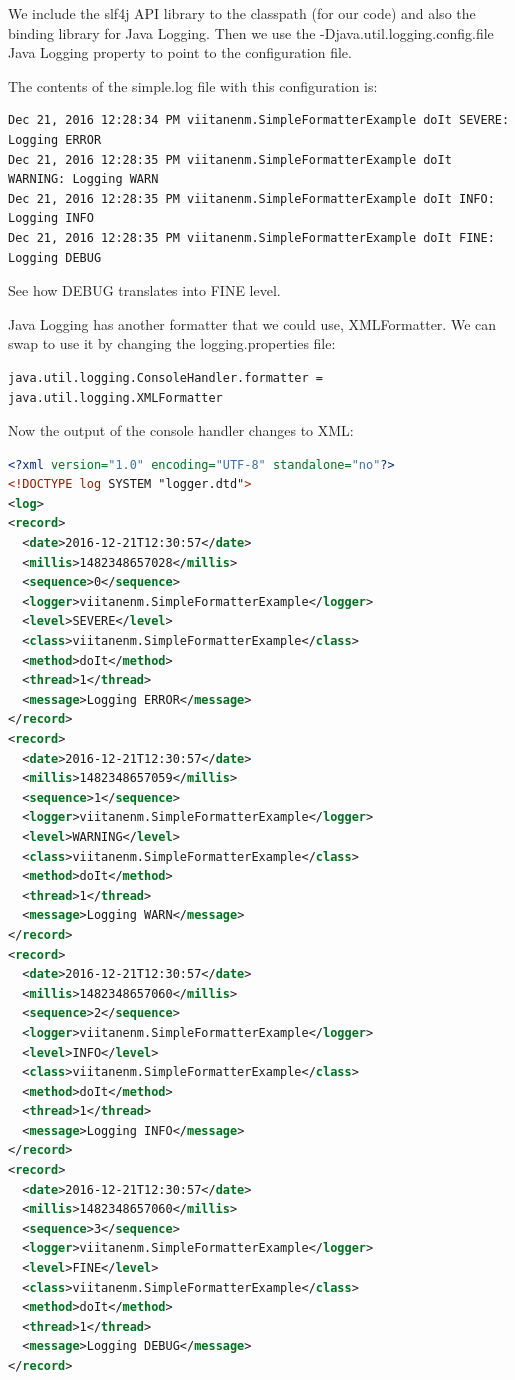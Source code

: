 We include the slf4j API library to the classpath (for our code) and also the binding library for Java Logging. Then we use the -Djava.util.logging.config.file Java Logging property to point to the configuration file.

The contents of the simple.log file with this configuration is:
\begin{lstlisting}
Dec 21, 2016 12:28:34 PM viitanenm.SimpleFormatterExample doIt SEVERE: Logging ERROR
Dec 21, 2016 12:28:35 PM viitanenm.SimpleFormatterExample doIt WARNING: Logging WARN
Dec 21, 2016 12:28:35 PM viitanenm.SimpleFormatterExample doIt INFO: Logging INFO
Dec 21, 2016 12:28:35 PM viitanenm.SimpleFormatterExample doIt FINE: Logging DEBUG
\end{lstlisting}

See how DEBUG translates into FINE level.

Java Logging has another formatter that we could use, XMLFormatter. We can swap to use it by changing the logging.properties file:

\begin{lstlisting}
java.util.logging.ConsoleHandler.formatter = java.util.logging.XMLFormatter
\end{lstlisting}

Now the output of the console handler changes to XML:
\begin{lstlisting}[language=XML]
<?xml version="1.0" encoding="UTF-8" standalone="no"?>
<!DOCTYPE log SYSTEM "logger.dtd">
<log>
<record>
  <date>2016-12-21T12:30:57</date>
  <millis>1482348657028</millis>
  <sequence>0</sequence>
  <logger>viitanenm.SimpleFormatterExample</logger>
  <level>SEVERE</level>
  <class>viitanenm.SimpleFormatterExample</class>
  <method>doIt</method>
  <thread>1</thread>
  <message>Logging ERROR</message>
</record>
<record>
  <date>2016-12-21T12:30:57</date>
  <millis>1482348657059</millis>
  <sequence>1</sequence>
  <logger>viitanenm.SimpleFormatterExample</logger>
  <level>WARNING</level>
  <class>viitanenm.SimpleFormatterExample</class>
  <method>doIt</method>
  <thread>1</thread>
  <message>Logging WARN</message>
</record>
<record>
  <date>2016-12-21T12:30:57</date>
  <millis>1482348657060</millis>
  <sequence>2</sequence>
  <logger>viitanenm.SimpleFormatterExample</logger>
  <level>INFO</level>
  <class>viitanenm.SimpleFormatterExample</class>
  <method>doIt</method>
  <thread>1</thread>
  <message>Logging INFO</message>
</record>
<record>
  <date>2016-12-21T12:30:57</date>
  <millis>1482348657060</millis>
  <sequence>3</sequence>
  <logger>viitanenm.SimpleFormatterExample</logger>
  <level>FINE</level>
  <class>viitanenm.SimpleFormatterExample</class>
  <method>doIt</method>
  <thread>1</thread>
  <message>Logging DEBUG</message>
</record>
\end{lstlisting}

